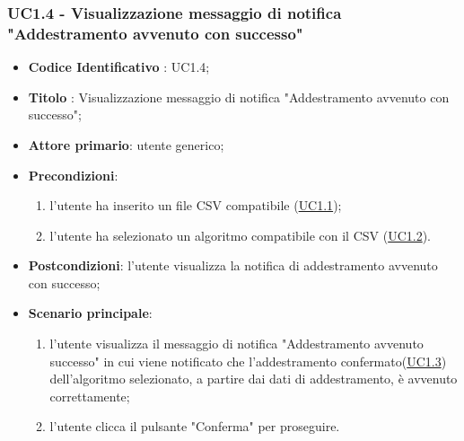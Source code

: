 	\subsubsection{UC1.4 - Visualizzazione messaggio di notifica "Addestramento avvenuto con successo"}
		\begin{itemize}
			\item\textbf{Codice Identificativo} : UC1.4;
			\item\textbf{Titolo} : Visualizzazione messaggio di notifica "Addestramento avvenuto con successo";
			\item\textbf{Attore primario}: utente generico;
			\item\textbf{Precondizioni}: 
				\begin{enumerate}
					\item l'utente ha inserito un file CSV compatibile (\hyperref[par:UC1.1]{UC1.1});
					\item l'utente ha selezionato un algoritmo compatibile con il CSV  (\hyperref[par:UC1.2]{UC1.2}).
				\end{enumerate}
			\item\textbf{Postcondizioni}: l'utente visualizza la notifica di addestramento avvenuto con successo;					
			\item\textbf{Scenario principale}:
				\begin{enumerate}
					\item l'utente visualizza il messaggio di notifica "Addestramento avvenuto successo" in cui viene notificato che l'addestramento confermato(\hyperref[par:UC1.3]{UC1.3}) dell'algoritmo selezionato, a partire dai dati di addestramento, è avvenuto correttamente;
					\item l'utente clicca il pulsante "Conferma" per proseguire.		
				\end{enumerate}		
		\end{itemize}
		
	\label{par:UC1.5}
